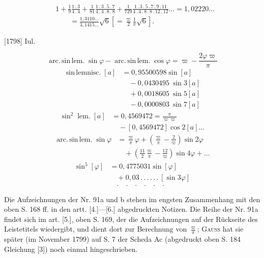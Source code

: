 \clearpage{}
\[
\begin{aligned}
&1+\frac19\frac{1\,.\,3}{4\,.\,4}+\frac1{81}\frac{1\,.\,3\,.\,5\,.\,7}{4\,.\,4\,.\,8\,.\,8}+\frac1{729}\frac{1\,.\,3\,.\,5\,.\,7\,.\,9\,.\,11}{4\,.\,4\,.\,8\,.\,8\,.\,12\,.\,12}\ldots=1{,}02220\ldots\\
&\qquad=\frac{1{,}3110\ldots}{3{,}1415\ldots}\surd6\left[=\frac\varpi2\frac1\pi\sqrt6\right].
\end{aligned}
\]
\par\noindent\hfill[1798] Iul.

\[
\operatorname{arc.\,sin\,lem.}\sin\varphi-\operatorname{arc.\,sin\,lem.}\cos\varphi=\varpi-\frac{2\varphi\varpi}\pi
\]
\[
\begin{aligned}
\operatorname{sin\,lemnisc.}[a]&=0{,}95500598\sin[a]\\
&\quad-0{,}0430495\ \sin3[a]\\
&\quad+0{,}0018605\ \sin5[a]\\
&\quad-0{,}0000803\ \sin7[a]
\end{aligned}
\]
\[
\begin{aligned}
\sin^2\operatorname{lem.}[a]&=0{,}4569472=\frac\pi{\varpi\varpi}\\
&\quad-[0{,}4569472]\cos2[a]\ldots
\end{aligned}
\]
\[
\begin{aligned}
\operatorname{arc.\,sin\,lem.}\sin\varphi
&=\frac\varpi\pi\varphi+\left(\frac\varpi\pi-\frac2\varpi\right)\sin2\varphi\\
&\quad+\left(\frac{11}2\frac\varpi\pi-\frac{12}\varpi\right)\sin4\varphi+\ldots
\end{aligned}
\]
\[
\begin{aligned}
\sin^5[\varphi]&=0{,}4775031\sin[\varphi]\\
&\quad+0{,}03\,.\,.\,.\,.\,.\,.\ [\sin3\varphi]\\
&\quad .\quad .\quad .\quad .\quad .\quad .
\end{aligned}
\]

\medskip\begingroup\small
\indent Die Aufzeichnungen der Nr. 91a und b stehen im engsten Zusammenhang mit den oben S. 168 ff. in den artt. [4.]—[6.] abgedruckten Notizen. Die Reihe der Nr. 91a findet sich im art. [5.], oben S. 169, der die Aufzeichnungen auf der Rückseite des Leistetitels wiedergibt, und dient dort zur Berechnung von \(\frac\varpi\pi\); \textsc{Gauss} hat sie später (im November 1799) auf S. 7 der Scheda Ac (abgedruckt oben S. 184 Gleichung [3]) noch einmal hingeschrieben.


